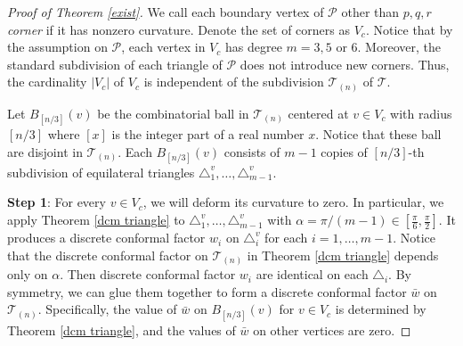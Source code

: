 \documentclass[12pt]{amsart}
\begin{document}
\begin{proof}[Proof of Theorem \ref{exist}]
    We call each boundary vertex of $\mathcal{P}$ other than ${p, q, r}$ \emph{corner} if it has nonzero curvature. Denote the set of corners as $V_c$. Notice that by the assumption on $\mathcal{P}$, each vertex in $V_c$ has degree $m = 3, 5$ or $6$. Moreover, the standard subdivision of each triangle of $\mathcal{P}$ does not introduce new corners. Thus, the cardinality $|V_c|$ of $V_c$ is independent of the subdivision $\mathcal{T}_{(n)}$ of $\mathcal{T}$.

    Let  ${B_{[n/3]}}(v)$ be the combinatorial ball in $\mathcal{T}_{(n)}$ centered at $v\in V_c$ with radius $ [n/3]$ where $[x]$ is the integer part of a real number $x$. Notice that these ball are disjoint in $\mathcal{T}_{(n)}$. Each ${B_{[n/3]}}(v)$ consists of $m-1$ copies of $[n/3]$-th subdivision of equilateral triangles $\triangle_1^v, \dots, \triangle_{m-1}^v$.

    \textbf{Step 1}: For every $v\in V_c$, we will deform its curvature to zero. In particular, we apply Theorem \ref{dcm triangle}
    to $\triangle_1^v, \dots, \triangle_{m-1}^v$ with $\alpha = \pi/(m-1)\in [\frac{\pi}{6}, \frac{\pi}{2}]$. It produces a discrete conformal factor $w_i$ on $\triangle_i^v$ for each $i = 1, \dots, m-1$. Notice that the discrete conformal factor on $\mathcal{T}_{(n)}$ in Theorem \ref{dcm triangle} depends only on $\alpha$. Then discrete conformal factor $w_i$ are identical on each $\triangle_i$. By symmetry, we can glue them together to form a discrete conformal factor $\bar w$ on $\mathcal{T}_{(n)}$. Specifically, the value of $\bar w$ on  ${B_{[n/3]}}(v)$ for $v\in V_c$ is determined by Theorem \ref{dcm triangle}, and the values of $\bar w$ on other vertices are zero.


\end{proof}
\end{document}
